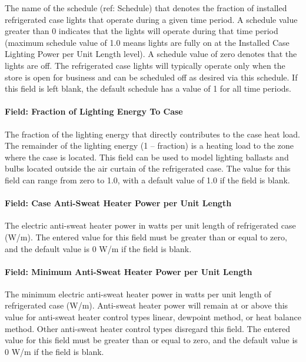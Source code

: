 The name of the schedule (ref: Schedule) that denotes the fraction of installed refrigerated case lights that operate during a given time period. A schedule value greater than 0 indicates that the lights will operate during that time period (maximum schedule value of 1.0 means lights are fully on at the Installed Case Lighting Power per Unit Length level). A schedule value of zero denotes that the lights are off. The refrigerated case lights will typically operate only when the store is open for business and can be scheduled off as desired via this schedule. If this field is left blank, the default schedule has a value of 1 for all time periods.

\paragraph{Field: Fraction of Lighting Energy To Case}\label{field-fraction-of-lighting-energy-to-case}

The fraction of the lighting energy that directly contributes to the case heat load. The remainder of the lighting energy (1 -- fraction) is a heating load to the zone where the case is located. This field can be used to model lighting ballasts and bulbs located outside the air curtain of the refrigerated case. The value for this field can range from zero to 1.0, with a default value of 1.0 if the field is blank.

\paragraph{Field: Case Anti-Sweat Heater Power per Unit Length}\label{field-case-anti-sweat-heater-power-per-unit-length}

The electric anti-sweat heater power in watts per unit length of refrigerated case (W/m). The entered value for this field must be greater than or equal to zero, and the default value is 0 W/m if the field is blank.

\paragraph{Field: Minimum Anti-Sweat Heater Power per Unit Length}\label{field-minimum-anti-sweat-heater-power-per-unit-length}

The minimum electric anti-sweat heater power in watts per unit length of refrigerated case (W/m). Anti-sweat heater power will remain at or above this value for anti-sweat heater control types linear, dewpoint method, or heat balance method. Other anti-sweat heater control types disregard this field. The entered value for this field must be greater than or equal to zero, and the default value is 0 W/m if the field is blank.

